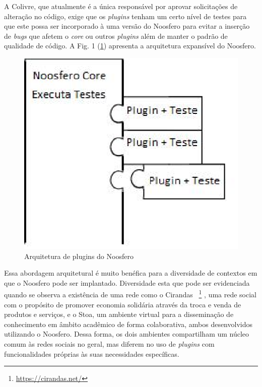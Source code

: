 A Colivre, que atualmente é a única responsável por aprovar solicitações de
alteração no código, exige que os \textit{plugins} tenham um certo nível de
testes para que este possa ser incorporado à uma versão do Noosfero para
evitar a inserção de \textit{bugs} que afetem o \textit{core} ou
outros \textit{plugins} além de manter o padrão de qualidade de código. A
Fig. 1 (\ref{plugins}) apresenta a arquitetura expansível do Noosfero.

\begin{figure}[h]
	\centering
	\label{plugins}
		\includegraphics[keepaspectratio=true,scale=0.6]{figuras/plugins.eps}
	\caption{Arquitetura de plugins do Noosfero}
\end{figure}

Essa abordagem arquitetural é muito benéfica para a diversidade de contextos
em que o Noosfero pode ser implantado. Diversidade esta que pode ser evidenciada
quando se observa a existência de uma rede como o Cirandas
~\footnote{\url{https://cirandas.net/}}
, uma rede social com o propósito de promover economia solidária através
da troca e venda de produtos e serviços, e o
Stoa, um ambiente virtual para a disseminação de conhecimento em âmbito
acadêmico de forma colaborativa, ambos desenvolvidos utilizando o Noosfero.
Dessa forma, os dois ambientes compartilham um núcleo comum às redes sociais
no geral, mas diferem no uso de \textit{plugins} com funcionalidades próprias
às suas necessidades específicas.




